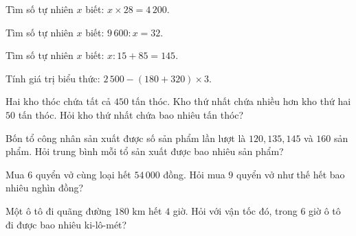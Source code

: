 \begin{ex}
  Tìm số tự nhiên $x$ biết: $x \times 28 = 4\,200$.
\end{ex}

\begin{ex}
  Tìm số tự nhiên $x$ biết: $9\,600 : x = 32$.
\end{ex}

\begin{ex}
  Tìm số tự nhiên $x$ biết: $x : 15 + 85 = 145$.
\end{ex}

\begin{ex}
  Tính giá trị biểu thức: $2\,500 - (180 + 320) \times 3$.
\end{ex}

\begin{ex}
  Hai kho thóc chứa tất cả $450$ tấn thóc. Kho thứ nhất chứa nhiều hơn kho thứ hai $50$ tấn thóc. Hỏi kho thứ nhất chứa bao nhiêu tấn thóc?
\end{ex}

\begin{ex}
  Bốn tổ công nhân sản xuất được số sản phẩm lần lượt là $120, 135, 145$ và $160$ sản phẩm. Hỏi trung bình mỗi tổ sản xuất được bao nhiêu sản phẩm?
\end{ex}

\begin{ex}
  Mua $6$ quyển vở cùng loại hết $54\,000$ đồng. Hỏi mua $9$ quyển vở như thế hết bao nhiêu nghìn đồng?
\end{ex}

\begin{ex}
  Một ô tô đi quãng đường $180\text{ km}$ hết $4$ giờ. Hỏi với vận tốc đó, trong $6$ giờ ô tô đi được bao nhiêu ki-lô-mét?
\end{ex}

